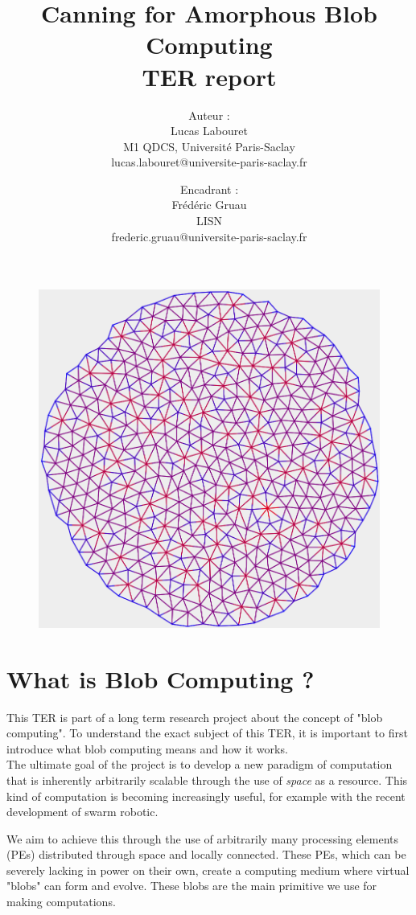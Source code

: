 \documentclass{article}
\title{
	Canning for Amorphous Blob Computing\\
	\small TER report
}
\author{
    Auteur :\\
    Lucas Labouret\\
    M1 QDCS, Université Paris-Saclay\\
    \small lucas.labouret@universite-paris-saclay.fr
    \and
    Encadrant :\\
    Frédéric Gruau\\
    LISN\\
    \small frederic.gruau@universite-paris-saclay.fr
}
\date{}
\begin{document}
 
\maketitle

\begin{figure}[H]
	\centering\includegraphics[width=0.9\linewidth]{assets/Circle500.png}
\end{figure}

\newpage
\tableofcontents
\newpage

\renewcommand{\thesection}{\Alph{section}}

\section{What is Blob Computing ?}

This TER is part of a long term research project about the concept of "blob computing"\supercite{blob_computing1}. To understand the exact subject of this TER, it is important to first introduce what blob computing means and how it works.\\

The ultimate goal of the project is to develop a new paradigm of computation that is inherently arbitrarily scalable through the use of \textit{space} as a resource. This kind of computation is becoming increasingly useful, for example with the recent development of swarm robotic\supercite{swarm_robotic}.

We aim to achieve this through the use of arbitrarily many processing elements (PEs) distributed through space and locally connected. These PEs, which can be severely lacking in power on their own, create a computing medium where virtual "blobs" can form and evolve. These blobs are the main primitive we use for making computations. 
\end{document}
